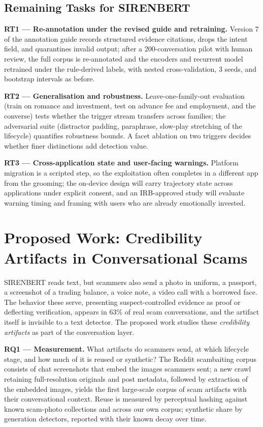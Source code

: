 \documentclass[letterpaper,11pt]{article}
\begin{document}
\subsection{Remaining Tasks for SIRENBERT}
\label{sec:tasks}

\textbf{RT1 --- Re-annotation under the revised guide and retraining.}
Version 7 of the annotation guide records structured evidence
citations, drops the intent field, and quarantines invalid output;
after a 200-conversation pilot with human review, the full corpus is
re-annotated and the encoders and recurrent model retrained under the
rule-derived labels, with nested cross-validation, 3 seeds, and
bootstrap intervals as before.

\textbf{RT2 --- Generalisation and robustness.} Leave-one-family-out
evaluation (train on romance and investment, test on advance fee and
employment, and the converse) tests whether the trigger stream
transfers across families; the adversarial suite (distractor padding,
paraphrase, slow-play stretching of the lifecycle) quantifies robustness
bounds. A facet ablation on two triggers decides whether finer
distinctions add detection value.

\textbf{RT3 --- Cross-application state and user-facing warnings.}
Platform migration is a scripted step, so the exploitation often
completes in a different app from the grooming; the on-device design
will carry trajectory state across applications under explicit consent,
and an IRB-approved study will evaluate warning timing and framing with
users who are already emotionally invested.

\section{Proposed Work: Credibility Artifacts in Conversational Scams}
\label{sec:proposed}

SIRENBERT reads text, but scammers also send a photo in uniform, a
passport, a screenshot of a trading balance, a voice note, a video call
with a borrowed face. The behavior these serve, presenting
suspect-controlled evidence as proof or deflecting verification, appears
in 63\% of real scam conversations, and the artifact itself is
invisible to a text detector. The proposed work studies these
\emph{credibility artifacts} as part of the conversation layer.

\textbf{RQ1 --- Measurement.} What artifacts do scammers send, at which
lifecycle stage, and how much of it is reused or synthetic? The Reddit
scambaiting corpus consists of chat screenshots that embed the images
scammers sent; a new crawl retaining full-resolution originals and post
metadata, followed by extraction of the embedded images, yields the
first large-scale corpus of scam artifacts with their conversational
context. Reuse is measured by perceptual hashing against known
scam-photo collections and across our own corpus; synthetic share by
generation detectors, reported with their known decay over time.
\end{document}
